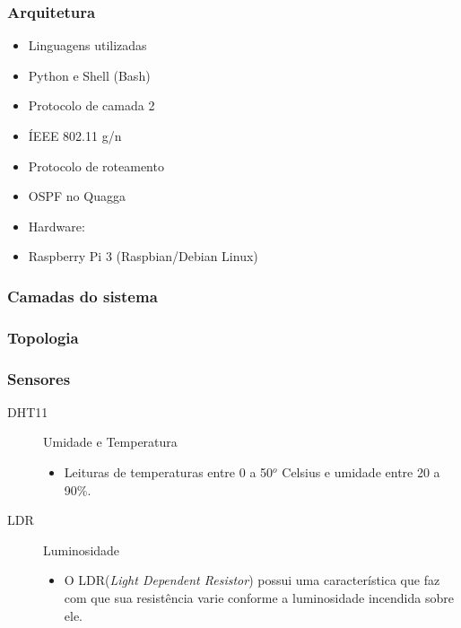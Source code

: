
\begin{frame}
\frametitle{Arquitetura}
\begin{itemize}
	\item Linguagens utilizadas
	\item Python e Shell (Bash)
	\item Protocolo de camada 2
	\item ÍEEE 802.11 g/n
	\item Protocolo de roteamento
	\item OSPF no Quagga
	\item Hardware:
	\item Raspberry Pi 3 (Raspbian/Debian Linux)
\end{itemize}

\end{frame}


\begin{frame}
	\frametitle{Camadas do sistema}

	\begin{figure}[h]
		\centering
		\label{System-Layers}
 	\end{figure}

\end{frame}


\begin{frame}
	\frametitle{Topologia}
\end{frame}


\begin{frame}
	\frametitle{Sensores}

\begin{description}
	\item [DHT11] Umidade e Temperatura
	\begin{itemize}
		\item Leituras de temperaturas entre 0 a 50$^o$ Celsius e umidade entre 20 a 90\%.
	\end{itemize}
	\item [LDR] Luminosidade
	\begin{itemize}
		\item O LDR(\textit{Light Dependent Resistor}) possui uma característica que faz com que sua resistência varie conforme a luminosidade incendida  sobre ele.
	\end{itemize}
\end{description}

\end{frame}

